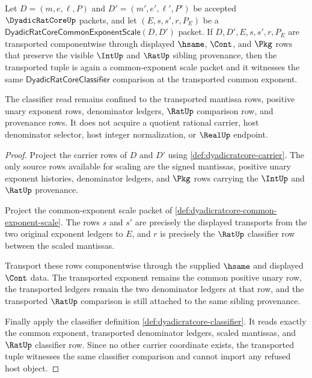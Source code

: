 \begin{theorem}
\label{thm:dyadicratcore-scale-classifier-stability}
Let $D=(m,e,\ell,P)$ and $D'=(m',e',\ell',P')$ be accepted $\DyadicRatCoreUp$ packets, and let $(E,s,s',r,P_E)$ be a $\mathsf{DyadicRatCoreCommonExponentScale}(D,D')$ packet. If $D,D',E,s,s',r,P_E$ are transported componentwise through displayed $\hsame$, $\Cont$, and $\Pkg$ rows that preserve the visible $\IntUp$ and $\RatUp$ sibling provenance, then the transported tuple is again a common-exponent scale packet and it witnesses the same $\mathsf{DyadicRatCoreClassifier}$ comparison at the transported common exponent.

The classifier read remains confined to the transported mantissa rows, positive unary exponent rows, denominator ledgers, $\RatUp$ comparison row, and provenance rows. It does not acquire a quotient rational carrier, host denominator selector, host integer normalization, or $\RealUp$ endpoint.
\end{theorem}
\begin{proof}
Project the carrier rows of $D$ and $D'$ using \autoref{def:dyadicratcore-carrier}. The only source rows available for scaling are the signed mantissas, positive unary exponent histories, denominator ledgers, and $\Pkg$ rows carrying the $\IntUp$ and $\RatUp$ provenance.

Project the common-exponent scale packet of \autoref{def:dyadicratcore-common-exponent-scale}. The rows $s$ and $s'$ are precisely the displayed transports from the two original exponent ledgers to $E$, and $r$ is precisely the $\RatUp$ classifier row between the scaled mantissas.

Transport these rows componentwise through the supplied $\hsame$ and displayed $\Cont$ data. The transported exponent remains the common positive unary row, the transported ledgers remain the two denominator ledgers at that row, and the transported $\RatUp$ comparison is still attached to the same sibling provenance.

Finally apply the classifier definition \autoref{def:dyadicratcore-classifier}. It reads exactly the common exponent, transported denominator ledgers, scaled mantissas, and $\RatUp$ classifier row. Since no other carrier coordinate exists, the transported tuple witnesses the same classifier comparison and cannot import any refused host object.
\end{proof}

